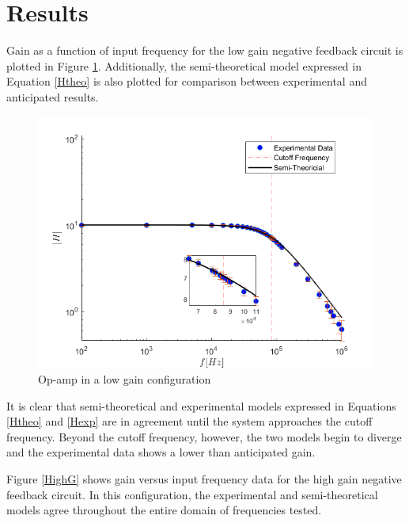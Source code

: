 \documentclass[letterpaper,12pt]{article}
\begin{document}
\section{Results}
Gain as a function of input frequency for the low gain negative feedback circuit is plotted in Figure \ref{LowG}. Additionally, the semi-theoretical model expressed in Equation \ref{Htheo} is also plotted for comparison between experimental and anticipated results.  

\begin{figure}[ht]
    \centering
    \includegraphics[scale = .6]{LowGain.png}
    \caption{Op-amp in a low gain configuration}
    \label{LowG}
\end{figure}
It is clear that semi-theoretical and experimental models expressed in Equations \ref{Htheo} and \ref{Hexp} are in agreement until the system approaches the cutoff frequency. Beyond the cutoff frequency, however, the two models begin to diverge and the experimental data shows a lower than anticipated gain.

Figure \ref{HighG} shows gain versus input frequency data for the high gain negative feedback circuit. In this configuration, the experimental and semi-theoretical models agree throughout the entire domain of frequencies tested.
\end{document}

